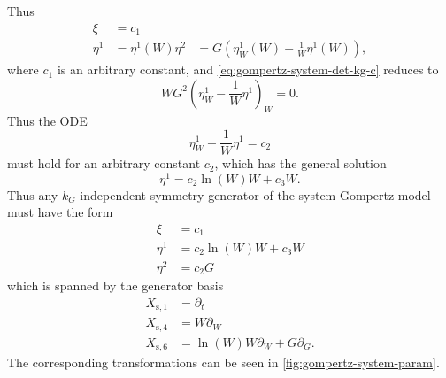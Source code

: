 Thus
\begin{align*}
  \xi &= c_1\\
  \eta^1 &= \eta^1(W)
  \eta^2 &= G \left(\eta^1_W(W) - \frac{1}{W} \eta^1(W) \right),
\end{align*}
where \(c_1\) is an arbitrary constant, and \cref{eq:gompertz-system-det-kg-c} reduces to
\begin{equation*}
  W G^2 \left(\eta^1_W - \frac{1}{W} \eta^1 \right)_W = 0.
\end{equation*}
Thus the ODE
\begin{equation*}
  \eta^1_W - \frac{1}{W} \eta^1 = c_2
\end{equation*}
must hold for an arbitrary constant \(c_2\), which has the general solution
\begin{equation*}
  \eta^1 = c_2 \ln(W) W + c_3 W.
\end{equation*}
Thus any \(k_G\)-independent symmetry generator of the system Gompertz model  must have the form
\begin{align*}
  \xi &= c_1 \\
  \eta^1 &= c_2 \ln(W) W + c_3 W\\
  \eta^2 &= c_2 G
\end{align*}
which is spanned by the generator basis
\begin{align*}
  X_{\text{s},1} &= \partial_t \\
  X_{\text{s},4} &= W \partial_W \\
  X_{\text{s},6} &= \ln(W) W \partial_W + G \partial_G.
\end{align*}
The corresponding transformations can be seen in \cref{fig:gompertz-system-param}.

